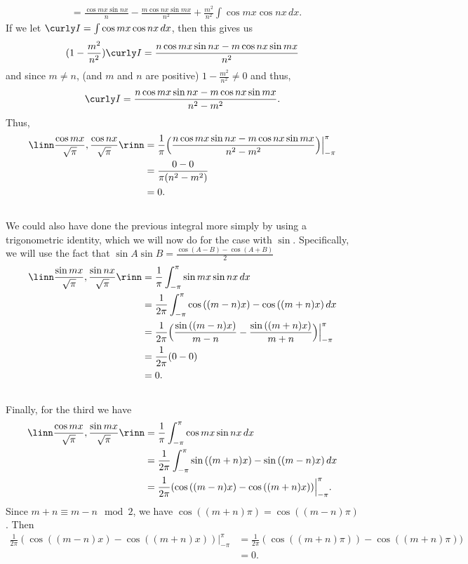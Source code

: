 \documentclass[12pt, letterpaper]{hmcpset}
\begin{document}
\begin{solution}
\[\begin{split}
						     & = \frac{\cos{mx}\sin{nx}}{n} - \frac{m \cos{nx} \sin{mx}}{n^2} + \frac{m^2}{n^2} \int \cos{mx} \cos{nx} \, dx.
		\end{split}
	\]
	If we let $\curly I = \int \cos{mx} \cos{nx} \, dx$, then this gives us
	\[
		(1 - \frac{m^2}{n^2}) \curly I = \frac{n \cos{mx} \sin{nx} - m \cos{nx} \sin{mx}}{n^2}
	\]
	and since $m \neq n$, (and $m$ and $n$ are positive) $1 - \frac{m^2}{n^2} \neq 0$ and thus,
	\[
		\curly I = \frac{n \cos{mx} \sin{nx} - m \cos{nx} \sin{mx}}{n^2 - m^2}.
	\]
	Thus,
	\[
		\begin{split}
			\linn \frac{\cos{mx}}{\sqrt \pi}, \frac{\cos{nx}}{\sqrt \pi} \rinn & = \frac{1}{\pi} \Big ( \frac{n \cos{mx} \sin{nx} - m \cos{nx} \sin{mx}}{n^2 - m^2} \Big ) \Big |_{-\pi}^\pi \\
											   & = \frac{0 - 0}{\pi (n^2 - m^2)} \\
											   & = 0.
		\end{split}
	\]\\
	We could also have done the previous integral more simply by using a trigonometric identity, which we will now do for the case with $\sin$. Specifically, we will use the fact that $\sin{A} \sin{B} = \frac{\cos{(A - B)} - \cos{(A + B)}}{2}$
	\[
		\begin{split}
			\linn \frac{\sin{mx}}{\sqrt \pi}, \frac{\sin{nx}}{\sqrt \pi} \rinn & = \frac{1}{\pi} \int_{-\pi}^\pi \sin{mx} \sin{nx} \, dx \\
											   & = \frac{1}{2 \pi} \int_{-\pi}^\pi \cos{((m - n)x)} - \cos{((m + n)x)} \, dx \\
											   & = \frac{1}{2 \pi} \Big ( \frac{\sin{((m - n)x)}}{m - n} - \frac{\sin{((m + n)x)}}{m + n} \Big ) \Big |_{-\pi}^\pi \\
											   & = \frac{1}{2 \pi} (0 - 0) \\
											   & = 0.
		\end{split}
	\]\\
	Finally, for the third we have
	\[
		\begin{split}
			\linn \frac{\cos{mx}}{\sqrt \pi}, \frac{\sin{mx}}{\sqrt \pi} \rinn & = \frac{1}{\pi} \int_{-\pi}^\pi \cos{mx} \sin{nx} \, dx \\
											   & = \frac{1}{2 \pi} \int_{-\pi}^\pi \sin{((m + n)x)} - \sin{((m - n)x)} \, dx \\
											   & = \frac{1}{2 \pi} ( \cos{((m - n)x)} - \cos{((m + n)x)} ) \Big |_{-\pi}^\pi.
		\end{split}
	\]
	Since $m + n \equiv m - n \mod 2$, we have $\cos{((m + n)\pi)} = \cos{((m - n)\pi)}$. Then
	\[
		\begin{split}
			\frac{1}{2 \pi} ( \cos{((m - n)x)} - \cos{((m + n)x)} ) \Big |_{-\pi}^\pi & = \frac{1}{2 \pi}(\cos{((m + n) \pi)}) - \cos{((m + n) \pi)}) \\
												  & = 0.
		\end{split}
	\]
\end{solution}
\end{document}

